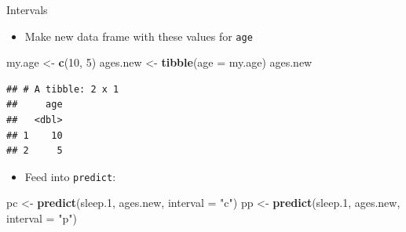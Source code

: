 \documentclass[
  ignorenonframetext,
]{beamer}
\newenvironment{Shaded}{\begin{snugshade}}{\end{snugshade}}
\newcommand{\DataTypeTok}[1]{\textcolor[rgb]{0.13,0.29,0.53}{#1}}
\newcommand{\DecValTok}[1]{\textcolor[rgb]{0.00,0.00,0.81}{#1}}
\newcommand{\FloatTok}[1]{\textcolor[rgb]{0.00,0.00,0.81}{#1}}
\newcommand{\KeywordTok}[1]{\textcolor[rgb]{0.13,0.29,0.53}{\textbf{#1}}}
\newcommand{\NormalTok}[1]{#1}
\newcommand{\StringTok}[1]{\textcolor[rgb]{0.31,0.60,0.02}{#1}}
\providecommand{\tightlist}{%
  \setlength{\itemsep}{0pt}\setlength{\parskip}{0pt}}
\begin{document}
\begin{frame}[fragile]{Intervals}
\protect\hypertarget{intervals}{}

\begin{itemize}
\tightlist
\item
  Make new data frame with these values for \texttt{age}
\end{itemize}

\begin{Shaded}
\begin{Highlighting}[]
\NormalTok{my.age <-}\StringTok{ }\KeywordTok{c}\NormalTok{(}\DecValTok{10}\NormalTok{, }\DecValTok{5}\NormalTok{)}
\NormalTok{ages.new <-}\StringTok{ }\KeywordTok{tibble}\NormalTok{(}\DataTypeTok{age =}\NormalTok{ my.age)}
\NormalTok{ages.new}
\end{Highlighting}
\end{Shaded}

\begin{verbatim}
## # A tibble: 2 x 1
##     age
##   <dbl>
## 1    10
## 2     5
\end{verbatim}

\begin{itemize}
\tightlist
\item
  Feed into \texttt{predict}:
\end{itemize}

\begin{Shaded}
\begin{Highlighting}[]
\NormalTok{pc <-}\StringTok{ }\KeywordTok{predict}\NormalTok{(sleep}\FloatTok{.1}\NormalTok{, ages.new, }\DataTypeTok{interval =} \StringTok{"c"}\NormalTok{)}
\NormalTok{pp <-}\StringTok{ }\KeywordTok{predict}\NormalTok{(sleep}\FloatTok{.1}\NormalTok{, ages.new, }\DataTypeTok{interval =} \StringTok{"p"}\NormalTok{)}
\end{Highlighting}
\end{Shaded}

\end{frame}
\end{document}
